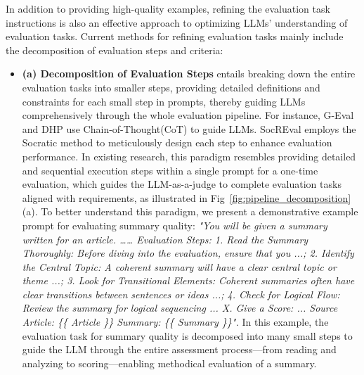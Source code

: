In addition to providing high-quality examples, refining the evaluation task instructions is also an effective approach to optimizing LLMs' understanding of evaluation tasks. Current methods for refining evaluation tasks mainly include the decomposition of evaluation steps and criteria: 
\begin{itemize}
    \item \textbf{(a) Decomposition of Evaluation Steps} entails breaking down the entire evaluation tasks into smaller steps, providing detailed definitions and constraints for each small step in prompts, thereby guiding LLMs comprehensively through the whole evaluation pipeline. For instance, G-Eval\cite{geval} and DHP\cite{dhp} use Chain-of-Thought(CoT)\cite{cot} to guide LLMs. SocREval\cite{he2024socreval} employs the Socratic method to meticulously design each step to enhance evaluation performance. In existing research, this paradigm resembles providing detailed and sequential execution steps within a single prompt for a one-time evaluation, which guides the LLM-as-a-judge to complete evaluation tasks aligned with requirements, as illustrated in Fig~\ref{fig:pipeline_decomposition}(a).
    To better understand this paradigm, we present a demonstrative example prompt for evaluating summary quality: \textit{"You will be given a summary written for an article. ……  Evaluation Steps: 1. Read the Summary Thoroughly: Before diving into the evaluation, ensure that you ...; 2. Identify the Central Topic: A coherent summary will have a clear central topic or theme ...; 3. Look for Transitional Elements: Coherent summaries often have clear transitions between sentences or ideas ...; 4. Check for Logical Flow: Review the summary for logical sequencing ... X. Give a Score: ... Source Article: \{\{ Article \}\} Summary: \{\{ Summary \}\}".} In this example, the evaluation task for summary quality is decomposed into many small steps to guide the LLM through the entire assessment process—from reading and analyzing to scoring—enabling methodical evaluation of a summary. 
    

\end{itemize}
